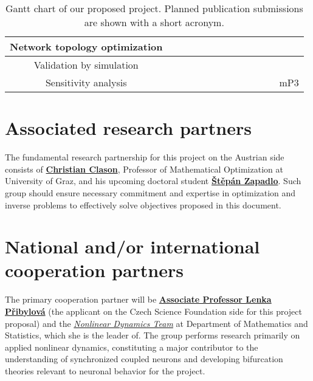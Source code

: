 \documentclass[a4paper,11pt]{scrartcl}
\begin{document}
\begin{table}[h!]
\begin{tabular}{|c|c|c|c|c|c|c|c|c|c|c|c|c|}
        \hline
        Network topology optimization & \cellcolor{yellow!25} & \cellcolor{yellow!25} & \cellcolor{yellow!25} & & \cellcolor{yellow!25} & \cellcolor{yellow!25} & \cellcolor{yellow!25} & & & & & \\
        \hline
        Validation by simulation & & & \cellcolor{yellow!25} & \cellcolor{yellow!25} & \cellcolor{yellow!25} & & \cellcolor{yellow!25} & \cellcolor{yellow!25} & \cellcolor{yellow!25} & & & \\
        \hline
        Sensitivity analysis & & & & \cellcolor{yellow!25} & \cellcolor{yellow!25} & & & & \cellcolor{yellow!25} & \cellcolor{yellow!25} & \cellcolor{yellow!25} & \cellcolor{yellow!25} mP3 \\
        \hline
    \end{tabular}
\caption{Gantt chart of our proposed project. Planned publication submissions are shown with a short acronym.}    
\label{tab:Gantt}
\end{table}

\section{Associated research partners}\label{sec:partners}

The fundamental research partnership for this project on the Austrian side consists of \textbf{\href{https://orcid.org/0000-0002-9948-8426}{Christian Clason}}, Professor of Mathematical Optimization at University of Graz, and his upcoming doctoral student \textbf{\href{https://orcid.org/0009-0008-7823-6239}{Štěpán Zapadlo}}. Such group should ensure necessary commitment and expertise in optimization and inverse problems to effectively solve objectives proposed in this document.

\section{National and/or international cooperation partners}\label{sec:cooperations}

The primary cooperation partner will be \textbf{\href{https://orcid.org/0000-0002-9027-4333}{Associate Professor Lenka Přibylová}} (the applicant on the Czech Science Foundation side for this project proposal) and the \textit{\href{https://science.math.muni.cz/ndteam/}{Nonlinear Dynamics Team}} at Department of Mathematics and Statistics, which she is the leader of. The group performs research primarily on applied nonlinear dynamics, constituting a major contributor to the understanding of synchronized coupled neurons and developing bifurcation theories relevant to neuronal behavior for the project.
\end{document}
